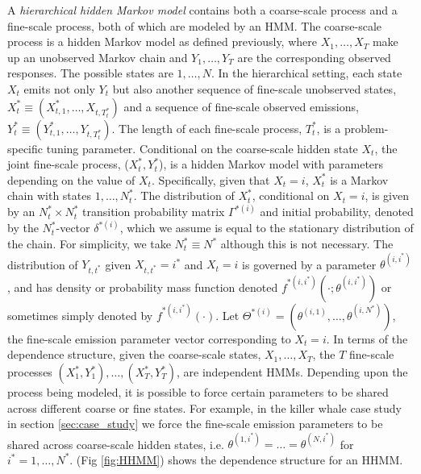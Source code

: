 A \textit{hierarchical hidden Markov model} contains both a coarse-scale process and a fine-scale process, both of which are modeled by an HMM. The coarse-scale process is a hidden Markov model as defined previously, where $X_1, \ldots, X_T$ make up an unobserved Markov chain and $Y_1,\ldots, Y_T$ are the corresponding observed responses. The possible states are $1,\ldots, N$.   
%
In the hierarchical setting, each state $X_t$ emits not only $Y_t$ but also another sequence of fine-scale unobserved states, $X_t^* \equiv (X_{t,1}^*,\ldots, X_{t,T_t^*})$ and a sequence of fine-scale observed emissions, $Y_t^* \equiv (Y_{t,1}^*,\ldots, Y_{t,T_t^*})$. The length of each fine-scale process, $T^*_t$, is a problem-specific tuning parameter. Conditional on the coarse-scale hidden state $X_t$, the joint fine-scale process, ($X_t^*, Y_t^*$), is a hidden Markov model with parameters depending on the value of $X_t$.  Specifically, given that $X_t=i$, $X_t^*$ is a Markov chain with states $1,\ldots, N_t^*$. The distribution of $X_t^*$, conditional on $X_t=i$, is given by an $N^*_t \times N^*_t$ transition probability matrix $\Gamma^{*(i)}$ and initial probability, denoted by the $N_t^*$-vector $\delta^{*(i)}$, which we assume is equal to the stationary distribution of the chain. For simplicity, we take $N_t^* \equiv N^*$ although this is not necessary.
%
The distribution of $Y_{t, t^*}$ given $X_{t, t^*}=i^*$ and $X_t=i$ is governed by a parameter $\theta^{(i,i^*)}$, and has density or probability mass function denoted $f^{*(i,i^*)}\left(\cdot; \theta^{(i,i^*)}\right)$ or sometimes simply denoted by $f^{*(i,i^*)}(\cdot)$. Let $\Theta^{*(i)}=\left(\theta^{(i,1)}, \ldots, \theta^{(i,N^*)}\right)$, the fine-scale emission parameter vector corresponding to $X_t=i$.
%
In terms of the dependence structure, given the coarse-scale states, $X_1,\ldots, X_T$, the $T$ fine-scale processes $(X_1^*, Y_1^*), \ldots, (X_T^*, Y_T^*)$, are independent HMMs. Depending upon the process being modeled, it is possible to force certain parameters to be shared across different coarse or fine states. For example, in the killer whale case study in section \ref{sec:case_study} we force the fine-scale emission parameters to be shared across coarse-scale hidden states, i.e. $\theta^{(1,i^*)} = \ldots = \theta^{(N,i^*)}$ for $i^* = 1, \ldots, N^*$. (Fig \ref{fig:HHMM}) shows the dependence structure for an HHMM.

